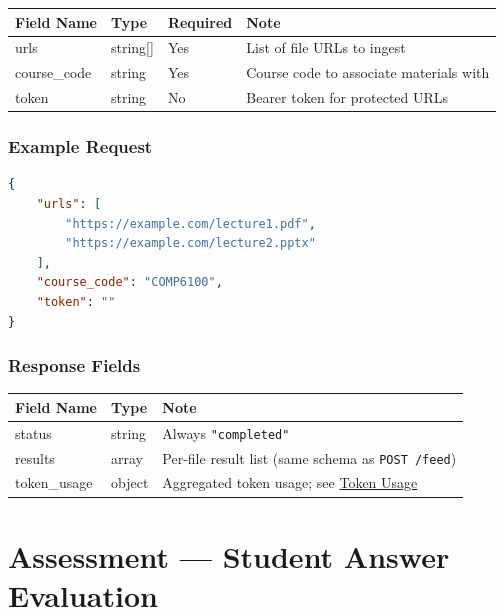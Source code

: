\documentclass[11pt]{article}
\begin{document}
\begin{longtable}{|p{3.5cm}|p{2cm}|p{2cm}|p{6.8cm}|}
  \hline
  \rowcolor{tabheader}
  \textbf{Field Name} & \textbf{Type} & \textbf{Required} & \textbf{Note} \\
  \hline
  \endhead
  urls         & string[] & Yes & List of file URLs to ingest \\
  \hline
  course\_code & string   & Yes & Course code to associate materials with \\
  \hline
  token        & string   & No  & Bearer token for protected URLs \\
  \hline
\end{longtable}

\subsubsection{Example Request}

\begin{lstlisting}[language=json]
{
    "urls": [
        "https://example.com/lecture1.pdf",
        "https://example.com/lecture2.pptx"
    ],
    "course_code": "COMP6100",
    "token": ""
}
\end{lstlisting}

\subsubsection{Response Fields}

\begin{longtable}{|p{4cm}|p{2cm}|p{8.7cm}|}
  \hline
  \rowcolor{tabheader}
  \textbf{Field Name} & \textbf{Type} & \textbf{Note} \\
  \hline
  \endhead
  status       & string & Always \texttt{"completed"} \\
  \hline
  results      & array  & Per-file result list (same schema as \texttt{POST /feed}) \\
  \hline
  token\_usage & object & Aggregated token usage; see \hyperref[sec:tokenusage]{Token Usage} \\
  \hline
\end{longtable}

\section{Assessment — Student Answer Evaluation}
\end{document}
